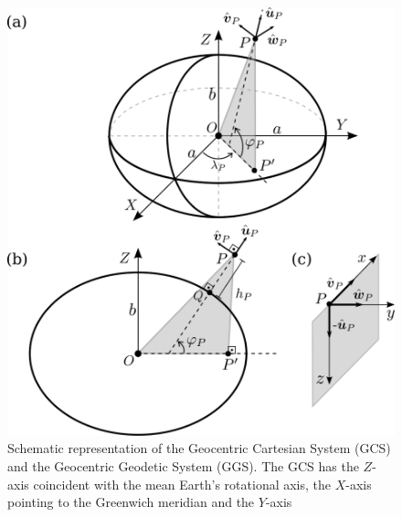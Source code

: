 \documentclass[extra]{gji}
\begin{document}




\appendix
%
%
%
%

\begin{figure}
    \includegraphics{figures/cartesian-geodetic-systems.png}
    \caption{Schematic representation of the Geocentric Cartesian System (GCS) and the Geocentric Geodetic System (GGS). The GCS has the $Z$-axis coincident with the mean Earth's rotational axis,
    the $X$-axis pointing to the Greenwich meridian and the $Y$-axis
}
\end{figure}
\end{document}
